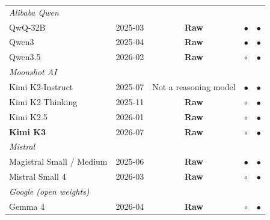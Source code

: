 \documentclass[manuscript,review,anonymous]{acmart}
\begin{document}
\begin{table}[H]
\begin{tabular}{llccc}
\multicolumn{5}{l}{\textit{Alibaba Qwen}~\cite{qwen2025qwq32b,qwen2025qwen3card,qwen2026qwen35card,alibaba2026deepthinking}} \\
\quad QwQ-32B               & 2025-03 & \textbf{Raw}        & $\bullet$ & $\bullet$ \\
\quad Qwen3                 & 2025-04 & \textbf{Raw}  & $\bullet$ & $\bullet$ \\
\quad Qwen3.5               & 2026-02 & \textbf{Raw}  & $\circ$   & $\bullet$ \\


\multicolumn{5}{l}{\textit{Moonshot AI}~\cite{moonshot2025k2instruct,moonshot2025k2thinking,moonshot2026k25,moonshot2026k3}} \\
\quad Kimi K2-Instruct      & 2025-07 & Not a reasoning model & $\bullet$ & $\bullet$ \\
\quad Kimi K2 Thinking      & 2025-11 & \textbf{Raw}        & $\circ$   & $\bullet$ \\
\quad Kimi K2.5             & 2026-01 & \textbf{Raw}  & $\circ$ & $\bullet$ \\
\quad \textbf{Kimi K3}      & 2026-07 & \textbf{Raw} & $\circ$ & $\bullet$ \\
\multicolumn{5}{l}{\textit{Mistral}~\cite{mistral2025magistral,mistral2025magistralpaper,mistral2026small4,mistral2026reasoning}} \\
\quad Magistral Small / Medium & 2025-06 & \textbf{Raw}     & $\bullet$ & $\bullet$ \\
\quad Mistral Small 4       & 2026-03 & \textbf{Raw}        & $\circ$   & $\bullet$ \\
\multicolumn{5}{l}{\textit{Google (open weights)}} \\
\quad Gemma 4               & 2026-04 & \textbf{Raw}        & $\circ$   & $\bullet$ \\
\hline
\end{tabular}




\end{table}
\end{document}
